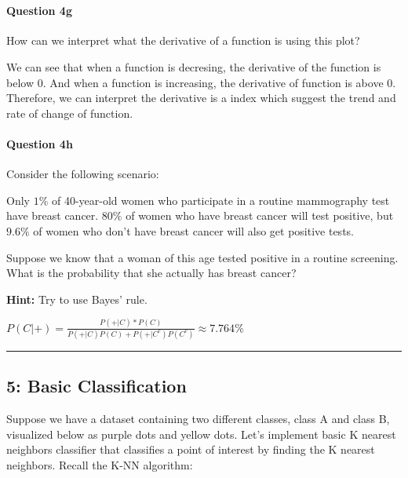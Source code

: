 \documentclass[11pt]{article}
\begin{document}
    \begin{center}
    \end{center}
    { \hspace*{\fill} \\}
    
    \paragraph{Question 4g}\label{question-4g}

How can we interpret what the derivative of a function is using this
plot?

    We can see that when a function is decresing, the derivative of the
function is below 0. And when a function is increasing, the derivative
of function is above 0. Therefore, we can interpret the derivative is a
index which suggest the trend and rate of change of function.

    \paragraph{Question 4h}\label{question-4h}

Consider the following scenario:

Only \(1\%\) of 40-year-old women who participate in a routine
mammography test have breast cancer. \(80\%\) of women who have breast
cancer will test positive, but \(9.6\%\) of women who don't have breast
cancer will also get positive tests.

Suppose we know that a woman of this age tested positive in a routine
screening. What is the probability that she actually has breast cancer?

\textbf{Hint:} Try to use Bayes' rule.

    \(P(C|+)=\frac{P(+|C)*P(C)}{P(+|C)P(C)+P(+|C^c)P(C^c)}\approx 7.764\%\)

    \begin{center}\rule{0.5\linewidth}{\linethickness}\end{center}

\subsection{5: Basic Classification}\label{basic-classification}

Suppose we have a dataset containing two different classes, class A and
class B, visualized below as purple dots and yellow dots. Let's
implement basic K nearest neighbors classifier that classifies a point
of interest by finding the K nearest neighbors. Recall the K-NN
algorithm:
\end{document}
